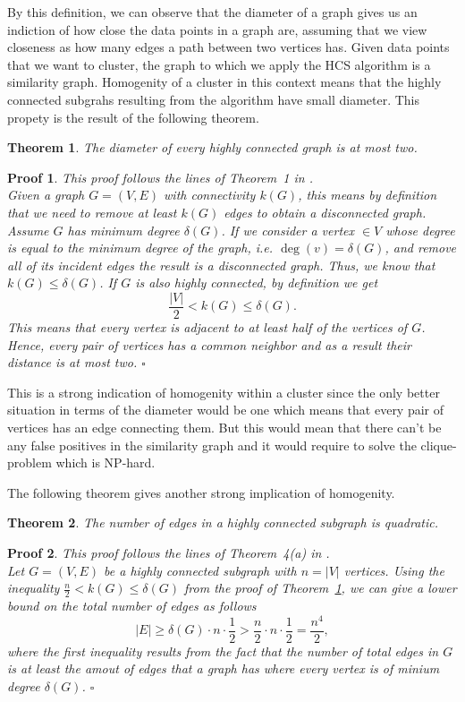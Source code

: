 \documentclass[paper=a4,fontsize=11pt,DIV=8,BCOR=5mm,twoside,pdftex,bibtotocnumbered]{scrreprt}
\theoremstyle{plain}
\newtheorem{thm}{Theorem}
\newtheorem*{myproof}{Proof}
\newenvironment{pf}{\begin{myproof}}{\hfill$\square$\end{myproof}}
\begin{document}
By this definition, we can observe that the diameter of a graph gives us an indiction of how close the data points in a graph are, assuming that we view closeness as how many edges a path between two vertices has. Given data points that we want to cluster, the graph to which we apply the HCS algorithm is a similarity graph. Homogenity of a cluster in this context means that the highly connected subgrahs resulting from the algorithm have small diameter. This propety is the result of the following theorem.

\begin{thm}\label{thm:diameter_highly_connected_subgraph}
	The diameter of every highly connected graph is at most two.
\end{thm}

\begin{pf}
	This proof follows the lines of Theorem~1 in \cite{Hartuv2000}.\\
	Given a graph $G=(V,E)$ with connectivity $k(G)$, this means by definition that we need to remove at least $k(G)$ edges to obtain a disconnected graph. Assume $G$ has minimum degree $\delta(G)$. If we consider a vertex $\in V$ whose degree is equal to the minimum degree of the graph, i.e. $\deg(v) = \delta(G)$, and remove all of its incident edges the result is a disconnected graph. Thus, we know that $k(G) \le \delta(G)$. If $G$ is also highly connected, by definition we get
	\[
	\frac{|V|}{2} < k(G) \le \delta(G).
	\]
	This means that every vertex is adjacent to at least half of the vertices of $G$. Hence, every pair of vertices has a common neighbor and as a result their distance is at most two.
\end{pf}

This is a strong indication of homogenity within a cluster since the only better situation in terms of the diameter would be one which means that every pair of vertices has an edge connecting them. But this would mean that there can't be any false positives in the similarity graph and it would require to solve the clique-problem which is NP-hard.

The following theorem gives another strong implication of homogenity.

\begin{thm}\label{thm:quadratic_cluster_size}
	The number of edges in a highly connected subgraph is quadratic.
\end{thm}

\begin{pf}
	This proof follows the lines of Theorem~4(a) in \cite{Hartuv2000}.\\
	Let $G=(V,E)$ be a highly connected subgraph with $n = |V|$ vertices. Using the inequality $\frac{n}{2} < k(G) \le \delta(G)$ from the proof of Theorem~\ref{thm:diameter_highly_connected_subgraph}, we can give a lower bound on the total number of edges as follows
	\[
	|E| \ge \delta(G) \cdot n \cdot \frac{1}{2} > \frac{n}{2} \cdot n \cdot \frac{1}{2} = \frac{n^4}{2},
	\]
	where the first inequality results from the fact that the number of total edges in $G$ is at least the amout of edges that a graph has where every vertex is of minium degree $\delta(G)$.
\end{pf}
\end{document}
